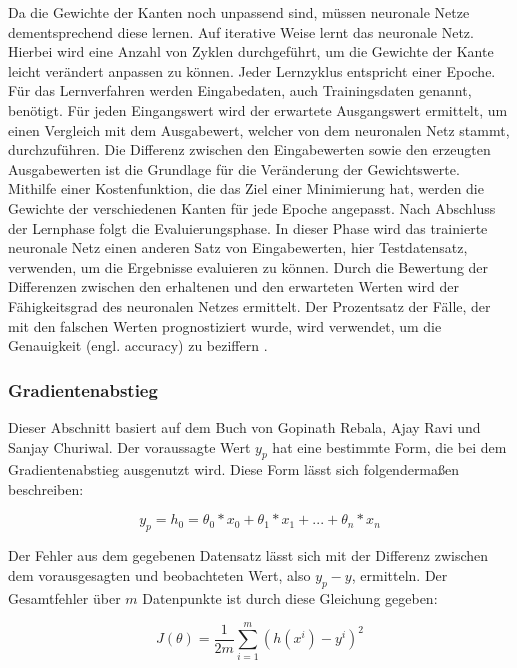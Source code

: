 Da die Gewichte der Kanten noch unpassend sind, müssen neuronale Netze dementsprechend diese lernen. Auf iterative Weise lernt das neuronale Netz. Hierbei wird eine Anzahl von Zyklen durchgeführt, um die Gewichte der Kante leicht verändert anpassen zu können. Jeder Lernzyklus entspricht einer Epoche. Für das Lernverfahren werden Eingabedaten, auch Trainingsdaten genannt, benötigt. Für jeden Eingangswert wird der erwartete Ausgangswert ermittelt, um einen Vergleich mit dem Ausgabewert, welcher von dem neuronalen Netz stammt, durchzuführen. Die Differenz zwischen den Eingabewerten sowie den erzeugten Ausgabewerten ist die Grundlage für die Veränderung der Gewichtswerte. Mithilfe einer Kostenfunktion, die das Ziel einer Minimierung hat, werden die Gewichte der verschiedenen Kanten für jede Epoche angepasst. Nach Abschluss der Lernphase folgt die Evaluierungsphase. In dieser Phase wird das trainierte neuronale Netz einen anderen Satz von Eingabewerten, hier Testdatensatz, verwenden, um die Ergebnisse evaluieren zu können. Durch die Bewertung der Differenzen zwischen den erhaltenen und den erwarteten Werten wird der Fähigkeitsgrad des neuronalen Netzes ermittelt. Der Prozentsatz der Fälle, der mit den falschen Werten prognostiziert wurde, wird verwendet, um die Genauigkeit (engl. accuracy) zu beziffern \cite{Gonzalez2018,IntroML,Vasilev2019}.


\subsubsection{Gradientenabstieg}

Dieser Abschnitt basiert auf dem Buch von Gopinath Rebala, Ajay Ravi und Sanjay Churiwal\cite{IntroML}.
\newline
Der voraussagte Wert $y_p$ hat eine bestimmte Form, die bei dem Gradientenabstieg ausgenutzt wird. Diese Form lässt sich folgendermaßen beschreiben:

\begin{equation}
y_p = h_0 = \theta_0 * x_0 + \theta_1 * x_1 + ... + \theta_n * x_n
\end{equation}

Der Fehler aus dem gegebenen Datensatz lässt sich mit der Differenz zwischen dem vorausgesagten und beobachteten Wert, also $y_p-y$, ermitteln. Der Gesamtfehler über $m$ Datenpunkte ist durch diese Gleichung gegeben:

\begin{equation}
\label{quad_fehler}
J(\theta) = \frac{1}{2m}\sum_{i=1}^{m}(h(x^i) - y^i)^2
\end{equation}

